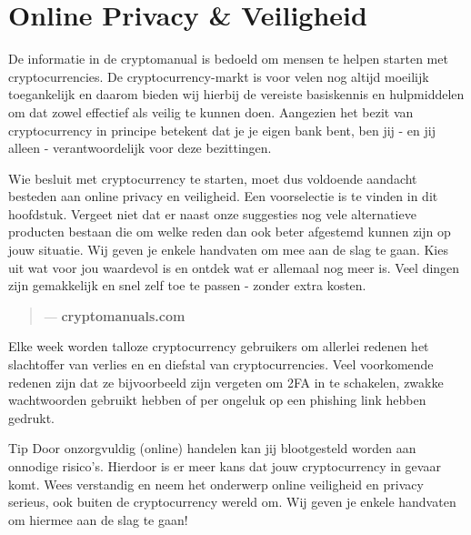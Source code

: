 \chapter{Online Privacy \& Veiligheid}
\label{ch:security}

De informatie in de {\selectfont cryptomanual}    is bedoeld om mensen te helpen starten met cryptocurrencies. De cryptocurrency-markt is voor velen nog altijd moeilijk toegankelijk en daarom bieden wij hierbij de vereiste basiskennis en hulpmiddelen om dat zowel effectief als veilig te kunnen doen. Aangezien het bezit van cryptocurrency in principe betekent dat je je eigen bank bent, ben jij - en jij alleen - verantwoordelijk voor deze bezittingen.\medskip 

Wie besluit met cryptocurrency te starten, moet dus voldoende aandacht besteden aan online privacy en veiligheid. Een voorselectie is te vinden in dit hoofdstuk. Vergeet niet dat er naast onze suggesties nog vele alternatieve producten bestaan die om welke reden dan ook beter afgestemd kunnen zijn op jouw situatie. Wij geven je enkele handvaten om mee aan de slag te gaan. Kies uit wat voor jou waardevol is en ontdek wat er allemaal nog meer is. Veel dingen zijn gemakkelijk en snel zelf toe te passen - zonder extra kosten. \medskip

\begin{quotation}

      \textit{}
      \begin{flushright}
        \small{--- \textbf{cryptomanuals.com}}
      \end{flushright}

\end{quotation}

Elke week worden talloze cryptocurrency gebruikers om allerlei redenen het slachtoffer van verlies en en diefstal van cryptocurrencies. Veel voorkomende redenen zijn dat ze bijvoorbeeld zijn vergeten om 2FA in te schakelen, zwakke wachtwoorden gebruikt hebben of per ongeluk op een phishing link hebben gedrukt.\medskip  

\begin{tipbox}{Tip}
Door onzorgvuldig (online) handelen kan jij blootgesteld worden aan onnodige risico's. Hierdoor is er meer kans dat jouw cryptocurrency in gevaar komt. Wees verstandig en neem het onderwerp online veiligheid en privacy serieus, ook buiten de cryptocurrency wereld om. Wij geven je enkele handvaten om hiermee aan de slag te gaan!    
\end{tipbox}



